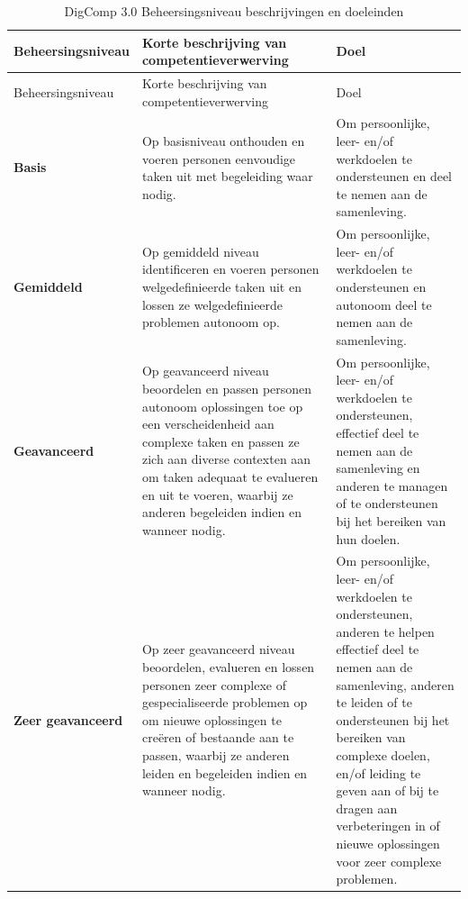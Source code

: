 \documentclass[
  dutch,
  letterpaper,
  DIV=11,
  numbers=noendperiod]{scrartcl}
\begin{document}
\begin{longtable}[]{@{}
  >{\raggedright\arraybackslash}p{}
  >{\raggedright\arraybackslash}p{}
  >{\raggedright\arraybackslash}p{}@{}}
\caption{DigComp 3.0 Beheersingsniveau beschrijvingen en
doeleinden}\label{tbl-beheersingsniveaus}\tabularnewline
\toprule\noalign{}
\begin{minipage}[b]{\linewidth}\raggedright
Beheersingsniveau
\end{minipage} & \begin{minipage}[b]{\linewidth}\raggedright
Korte beschrijving van competentieverwerving
\end{minipage} & \begin{minipage}[b]{\linewidth}\raggedright
Doel
\end{minipage} \\
\midrule\noalign{}
\endfirsthead
\toprule\noalign{}
\begin{minipage}[b]{\linewidth}\raggedright
Beheersingsniveau
\end{minipage} & \begin{minipage}[b]{\linewidth}\raggedright
Korte beschrijving van competentieverwerving
\end{minipage} & \begin{minipage}[b]{\linewidth}\raggedright
Doel
\end{minipage} \\
\midrule\noalign{}
\endhead
\bottomrule\noalign{}
\endlastfoot
\textbf{Basis} & Op basisniveau onthouden en voeren personen eenvoudige
taken uit met begeleiding waar nodig. & Om persoonlijke, leer- en/of
werkdoelen te ondersteunen en deel te nemen aan de samenleving. \\
\textbf{Gemiddeld} & Op gemiddeld niveau identificeren en voeren
personen welgedefinieerde taken uit en lossen ze welgedefinieerde
problemen autonoom op. & Om persoonlijke, leer- en/of werkdoelen te
ondersteunen en autonoom deel te nemen aan de samenleving. \\
\textbf{Geavanceerd} & Op geavanceerd niveau beoordelen en passen
personen autonoom oplossingen toe op een verscheidenheid aan complexe
taken en passen ze zich aan diverse contexten aan om taken adequaat te
evalueren en uit te voeren, waarbij ze anderen begeleiden indien en
wanneer nodig. & Om persoonlijke, leer- en/of werkdoelen te
ondersteunen, effectief deel te nemen aan de samenleving en anderen te
managen of te ondersteunen bij het bereiken van hun doelen. \\
\textbf{Zeer geavanceerd} & Op zeer geavanceerd niveau beoordelen,
evalueren en lossen personen zeer complexe of gespecialiseerde problemen
op om nieuwe oplossingen te creëren of bestaande aan te passen, waarbij
ze anderen leiden en begeleiden indien en wanneer nodig. & Om
persoonlijke, leer- en/of werkdoelen te ondersteunen, anderen te helpen
effectief deel te nemen aan de samenleving, anderen te leiden of te
ondersteunen bij het bereiken van complexe doelen, en/of leiding te
geven aan of bij te dragen aan verbeteringen in of nieuwe oplossingen
voor zeer complexe problemen. \\
\end{longtable}
\end{document}
